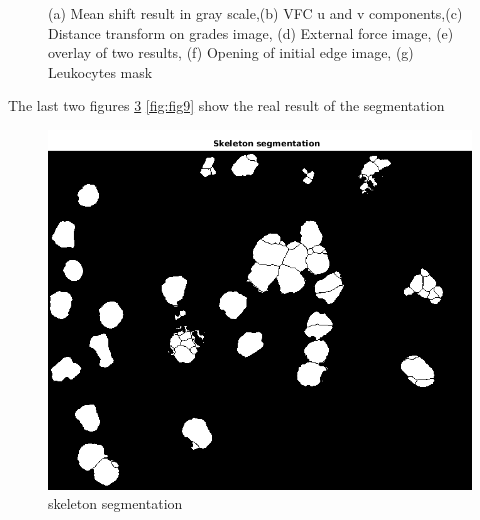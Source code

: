 \begin{figure}[htbp]
\begin{subfigure}[b]{0.45\textwidth}
        \caption{ }
        \label{fig:fig7}
    \end{subfigure}

    
    \caption{(a) Mean shift result in gray scale,(b) VFC u and v components,(c) Distance transform on grades image, (d) External force image, (e) overlay of two results, (f) Opening of initial edge image, (g) Leukocytes mask}
    \label{fig:alltheprocess}
\end{figure}
The last two figures \ref{fig:fig8} \ref{fig:fig9} show the real result of the segmentation

\begin{figure}
\centering
	\begin{center}
		\includegraphics[scale=0.5]{img/final/figure8.png}
		\caption{skeleton segmentation}
		\label{fig:fig8}
	\end{center}
\end{figure}
